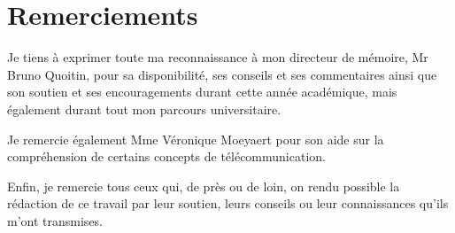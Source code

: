 \documentclass[12pt,a4paper,oneside, titlepage]{report}
\begin{document}
{}
\chapter*{Remerciements}
\renewcommand{\leftmark}{REMERCIEMENTS}

Je tiens à exprimer toute ma reconnaissance à mon directeur de mémoire, Mr Bruno Quoitin, pour sa disponibilité, ses conseils et ses commentaires ainsi que son soutien et ses encouragements durant cette année académique, mais également durant tout mon parcours universitaire.

\vspace{0.1cm}

Je remercie également Mme Véronique Moeyaert pour son aide sur la compréhension de certains concepts de télécommunication.

\vspace{0.1cm}

Enfin, je remercie tous ceux qui, de près ou de loin, on rendu possible la rédaction de ce travail par leur soutien, leurs conseils ou leur connaissances qu'ils m'ont transmises.

\newpage
\renewcommand{\leftmark}{TABLE DES MATI\`{E}RES}
\thispagestyle{fancy}
\tableofcontents
{}

















\newpage
\appendix
{}



\end{document}
